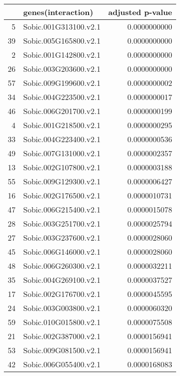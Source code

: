 \documentclass[12pt, a4paper]{article}
\begin{document}
\newpage

\begin{table}[ht]
\centering
\scriptsize
\begin{tabular}{rlr}

  \hline
 & genes(interaction) & adjusted p-value \\ 
  \hline
5 & Sobic.001G313100.v2.1 & 0.0000000000 \\ 
  39 & Sobic.005G165800.v2.1 & 0.0000000000 \\ 
  2 & Sobic.001G142800.v2.1 & 0.0000000000 \\ 
  26 & Sobic.003G203600.v2.1 & 0.0000000000 \\ 
  57 & Sobic.009G199600.v2.1 & 0.0000000002 \\ 
  34 & Sobic.004G223500.v2.1 & 0.0000000017 \\ 
  46 & Sobic.006G201700.v2.1 & 0.0000000199 \\ 
  4 & Sobic.001G218500.v2.1 & 0.0000000295 \\ 
  33 & Sobic.004G223400.v2.1 & 0.0000000536 \\ 
  49 & Sobic.007G131000.v2.1 & 0.0000002357 \\ 
  13 & Sobic.002G107800.v2.1 & 0.0000003188 \\ 
  55 & Sobic.009G129300.v2.1 & 0.0000006427 \\ 
  16 & Sobic.002G176500.v2.1 & 0.0000010731 \\ 
  47 & Sobic.006G215400.v2.1 & 0.0000015078 \\ 
  28 & Sobic.003G251700.v2.1 & 0.0000025794 \\ 
  27 & Sobic.003G237600.v2.1 & 0.0000028060 \\ 
  45 & Sobic.006G146000.v2.1 & 0.0000028060 \\ 
  48 & Sobic.006G260300.v2.1 & 0.0000032211 \\ 
  35 & Sobic.004G269100.v2.1 & 0.0000037527 \\ 
  17 & Sobic.002G176700.v2.1 & 0.0000045595 \\ 
  24 & Sobic.003G003800.v2.1 & 0.0000060320 \\ 
  59 & Sobic.010G015800.v2.1 & 0.0000075508 \\ 
  21 & Sobic.002G387000.v2.1 & 0.0000156941 \\ 
  53 & Sobic.009G081500.v2.1 & 0.0000156941 \\ 
  42 & Sobic.006G055400.v2.1 & 0.0000168083 \\ 

\end{tabular}
\end{table}
\end{document}
